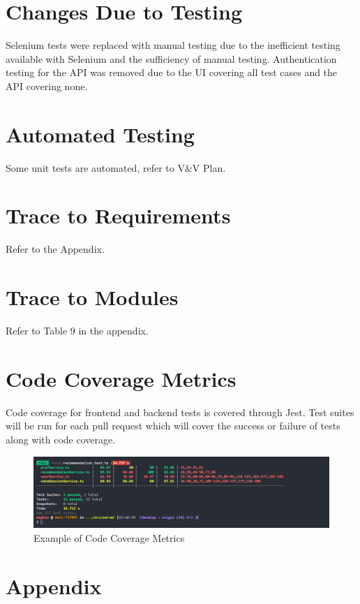 \documentclass[12pt, titlepage]{article}
\begin{document}
\newpage

\section{Changes Due to Testing}
Selenium tests were replaced with manual testing due to the inefficient testing available with Selenium and the sufficiency of manual testing. Authentication testing for the API was removed due to the UI covering all test cases and the API covering none. 
\section{Automated Testing}
Some unit tests are automated, refer to V\&V Plan.
\section{Trace to Requirements}
Refer to the Appendix.
		
\section{Trace to Modules}		
Refer to Table 9 in the appendix.


\section{Code Coverage Metrics}
Code coverage for frontend and backend tests is covered through Jest. Test suites will be run for each pull request which will cover the success or failure of tests along with code coverage. 

\begin{figure}[H]
	\begin{adjustwidth}{-2cm}{-2cm}
		\caption{Example of Code Coverage Metrics}
		\includegraphics[scale=.4]{Code Coverage Report BE.png}
	\end{adjustwidth}
\end{figure}



\newpage
\section*{Appendix}
\end{document}
